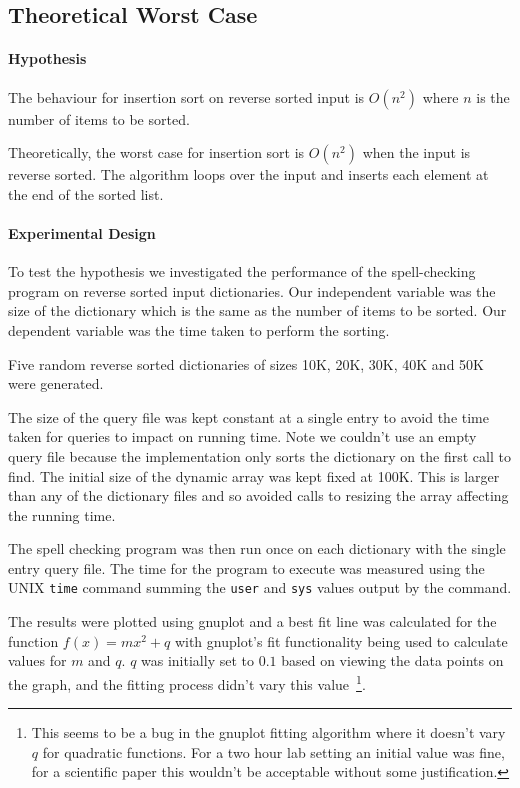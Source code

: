 \documentclass[a4]{article}
\begin{document}
\subsection{Theoretical Worst Case}
\label{sec:worst_case}

\paragraph{Hypothesis} The behaviour for insertion sort on reverse sorted input is $O(n^2)$ where $n$ is the number of items to be sorted.  

Theoretically, the worst case for insertion sort is $O(n^2)$ when the input is reverse sorted.  The algorithm loops over the input and inserts each element at the end of the sorted list.

\paragraph{Experimental Design}
To test the hypothesis we investigated the performance of the spell-checking program on reverse sorted input dictionaries.  Our independent variable was the size of the dictionary which is the same as the number of items to be sorted.  Our dependent variable was the time taken to perform the sorting.

Five random reverse sorted dictionaries of sizes 10K, 20K, 30K, 40K and 50K were generated.

The size of the query file was kept constant at a single entry to avoid the time taken for queries to impact on running time.  Note we couldn't use an empty query file because the implementation only sorts the dictionary on the first call to find.  The initial size of the dynamic array was kept fixed at 100K.  This is larger than any of the dictionary files and so avoided calls to resizing the array affecting the running time.

The spell checking program was then run once on each dictionary with the single entry query file.  The time for the program to execute was measured using the UNIX \texttt{time} command summing the \texttt{user} and \texttt{sys} values output by the command.  

The results were plotted using gnuplot and a best fit line was calculated for the function $f(x) = mx^2 + q$ with gnuplot's fit functionality being used to calculate values for $m$ and $q$.  $q$ was initially set to $0.1$ based on viewing the data points on the graph, and the fitting process didn't vary this value~\footnote{This seems to be a bug in the gnuplot fitting algorithm where it doesn't vary $q$ for quadratic functions.  For a two hour lab setting an initial value was fine, for a scientific paper this wouldn't be acceptable without some justification.}.  
\end{document}
